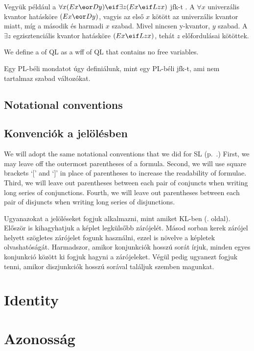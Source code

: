 Vegyük például a $\forall x(Ex \eor Dy) \eif \exists z(Ex \eif Lzx)$ jfk-t . A $\forall x$ univerzális  kvantor hatásköre $(Ex \eor Dy)$, vagyis az első $x$ kötött az univerzális kvantor miatt, míg a második és harmadi $x$ szabad. Mivel nincsen y-kvantor, $y$ szabad. A $\exists z$ egzisztenciális kvantor hatásköre $(Ex \eif Lzx)$, tehát $z$ előfordulásai kötöttek.

We define a  of QL as a wff of QL that contains no free variables.

Egy PL-béli mondatot úgy definiálunk, mint egy PL-béli jfk-t, ami nem tartalmaz szabad változókat.

\subsection*{Notational conventions}
\subsection{Konvenciók a jelölésben}	

We will adopt the same notational conventions that we did for SL (p.~\pageref{SLconventions}.) First, we may leave off the outermost parentheses of a formula. Second, we will use square brackets `[' and `]' in place of parentheses to increase the readability of formulae. Third, we will leave out parentheses between each pair of conjuncts when writing long series of conjunctions. Fourth, we will leave out parentheses between each pair of disjuncts when writing long series of disjunctions.

Ugyanazokat a jelöléseket fogjuk alkalmazni, mint amiket KL-ben (\pageref{SLconventions}. oldal). Először is kihagyhatjuk a képlet legkülsőbb zárójelét. Másod sorban kerek zárójel helyett szögletes zárójelet fogunk használni, ezzel is növelve a képletek olvashatóságát. Harmadszor, amikor konjunkciók hosszú sorát írjuk, minden egyes konjunkció között ki fogjuk hagyni a zárójeleket. Végül pedig ugyanezt fogjuk tenni, amikor diszjunkciók hosszú sorával találjuk szemben magunkat.



\section{Identity}
\label{sec.identity}

\section{Azonosság}
\label{sec.azonosság}

